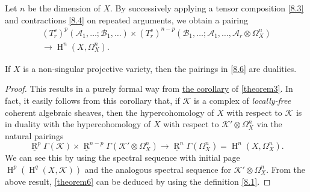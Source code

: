 \documentclass{article}
\theoremstyle{plain}
\newenvironment{theorem}[1]
  {\renewcommand\theinnercustomtheorem{#1}\innercustomtheorem}
  {\endinnercustomtheorem}
\theoremstyle{definition}
\newcommand{\sh}[1]{{\mathscr{#1}}}
\DeclareMathOperator{\RR}{R}
\DeclareMathOperator{\HH}{H}
\begin{document}
Let $n$ be the dimension of $X$.
By successively applying a tensor composition \cref{8.3} and contractions \cref{8.4} on repeated arguments, we obtain a pairing
\[
\label{8.6}
  \begin{gathered}
    (T_r^s)^p(\sh{A}_1,\ldots;\sh{B}_1,\ldots)
    \times (T_r^s)^{n-p}(\sh{B}_1,\ldots;\sh{A}_1,\ldots,\sh{A}_r\otimes\Omega_X^n)
  \\\longrightarrow\HH^n(X,\Omega_X^n).
  \end{gathered}
\tag{8.6}
\]

\begin{theorem}{6}
\label{theorem6}
  If $X$ is a non-singular projective variety, then the pairings in \cref{8.6} are dualities.
\end{theorem}

\begin{proof}
  This results in a purely formal way from \hyperref[theorem3corollary]{the corollary} of \cref{theorem3}.
  In fact, it easily follows from this corollary that, if $\sh{K}$ is a complex of \emph{locally-free} coherent algebraic sheaves, then the hypercohomology of $X$ with respect to $\sh{K}$ is in duality with the hypercohomology of $X$ with respect to $\sh{K}'\otimes\Omega_X^n$ via the natural pairings
  \[
  \label{8.7}
    \underline{\RR}^p\Gamma(\sh{K})
    \times \underline{\RR}^{n-p}\Gamma(\sh{K}'\otimes\Omega_X^n)
    \to \underline{\RR}^n\Gamma(\Omega_X^n)
    = \HH^n(X,\Omega_X^n).
  \tag{8.7}
  \]
  We can see this by using the spectral sequence with initial page $\HH^p(\HH^q(X,\sh{K}))$ and the analogous spectral sequence for $\sh{K}'\otimes\Omega_X^n$.
  From the above result, \cref{theorem6} can be deduced by using the definition \cref{8.1}.
\end{proof}
\end{document}
